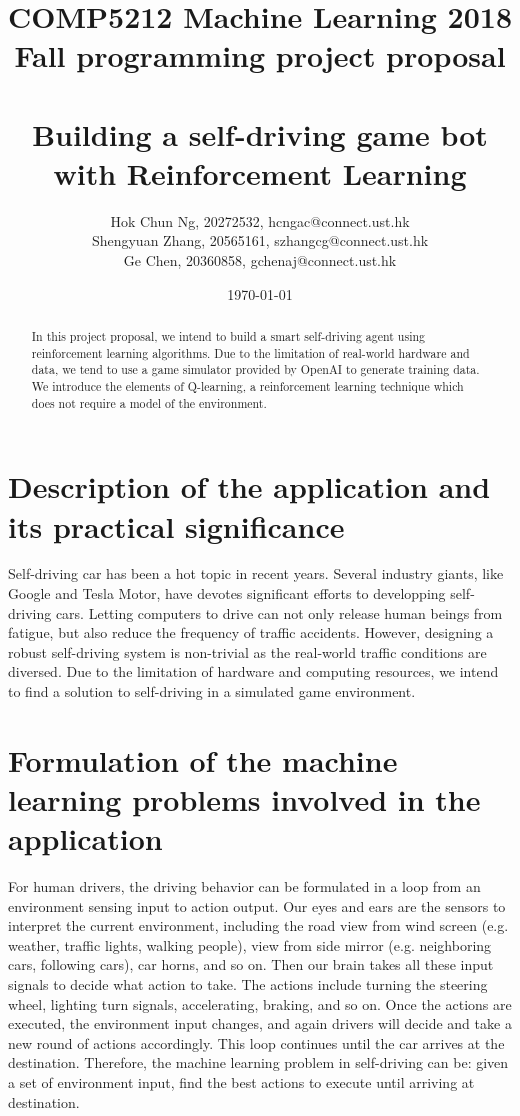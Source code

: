 \documentclass[a4paper]{article}
\title{COMP5212 Machine Learning 2018 Fall programming project proposal \\ 
       \ \ \ \ \\
       Building a self-driving game bot with Reinforcement Learning}
\author{Hok Chun Ng, 20272532, hcngac@connect.ust.hk \\
        Shengyuan Zhang, 20565161, szhangcg@connect.ust.hk \\
        Ge Chen, 20360858, gchenaj@connect.ust.hk}
\date{\today}
\begin{document}
\maketitle

\begin{abstract}
In this project proposal, we intend to build a smart self-driving agent using
reinforcement learning algorithms. Due to the limitation of real-world hardware
and data, we tend to use a game simulator provided by OpenAI to generate training
data. We introduce the elements of Q-learning, a reinforcement learning technique
which does not require a model of the environment.
\end{abstract}

\section{Description of the application and its practical significance}

Self-driving car has been a hot topic in recent years. Several industry giants,
like Google and Tesla Motor, have devotes significant efforts to developping
self-driving cars. Letting computers to drive
can not only release human beings from fatigue, but also reduce the frequency of
traffic accidents. However, designing a robust self-driving system is non-trivial
as the real-world traffic conditions are diversed. Due to the limitation of
hardware and computing resources, we intend to find a solution to self-driving in
a simulated game environment.


\section{Formulation of the machine learning problems involved in the application}

For human drivers, the driving behavior can be formulated in a loop from an environment
sensing input to action output. Our eyes and ears are the sensors to interpret the
current environment, including the road view from wind screen (e.g. weather, traffic lights,
walking people), view from side mirror (e.g. neighboring cars, following cars),
car horns, and so on. Then our brain takes all these input signals to decide what action
to take. The actions include turning the steering wheel, lighting turn signals, accelerating,
braking, and so on. Once the actions are executed, the environment input changes, and again
drivers will decide and take a new round of actions accordingly. This loop continues until
the car arrives at the destination. Therefore, the machine learning problem in self-driving
can be: given a set of environment input, find the best actions to execute until arriving
at destination.
\end{document}
